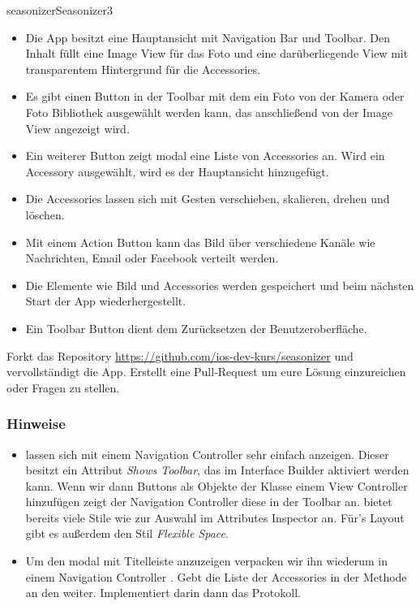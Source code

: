 \documentclass[parskip=half, final]{scrreprt}
\begin{document}
\begin{lecture}
\begin{exc}
\begin{excitem}{seasonizer}{Seasonizer}{3}
\begin{itemize}
	\item Die App besitzt eine Hauptansicht mit Navigation Bar und Toolbar. Den Inhalt füllt eine Image View für das Foto und eine darüberliegende View mit transparentem Hintergrund für die Accessories.
	\item Es gibt einen Button in der Toolbar mit dem ein Foto von der Kamera oder Foto Bibliothek ausgewählt werden kann, das anschließend von der Image View angezeigt wird.
	\item Ein weiterer Button zeigt modal eine Liste von Accessories an. Wird ein Accessory ausgewählt, wird es der Hauptansicht hinzugefügt.
	\item Die Accessories lassen sich mit Gesten verschieben, skalieren, drehen und löschen.
	\item Mit einem Action Button kann das Bild über verschiedene Kanäle wie Nachrichten, Email oder Facebook verteilt werden.
	\item Die Elemente wie Bild und Accessories werden gespeichert und beim nächsten Start der App wiederhergestellt.
	\item Ein Toolbar Button dient dem Zurücksetzen der Benutzeroberfläche.
\end{itemize}

Forkt das Repository \url{https://github.com/ios-dev-kurs/seasonizer} und vervollständigt die App. Erstellt eine Pull-Request um eure Lösung einzureichen oder Fragen zu stellen.

\subsubsection{Hinweise}

\begin{itemize}

\item {} lassen sich mit einem Navigation Controller sehr einfach anzeigen. Dieser besitzt ein Attribut \emph{Shows Toolbar}, das im Interface Builder aktiviert werden kann. Wenn wir dann Buttons als Objekte der  Klasse einem View Controller hinzufügen zeigt der Navigation Controller diese in der Toolbar an.  bietet bereits viele Stile wie  zur Auswahl im Attributes Inspector an. Für's Layout gibt es außerdem den Stil \emph{Flexible Space}.

\item Um den  modal mit Titelleiste anzuzeigen verpacken wir ihn wiederum in einem Navigation Controller . Gebt die Liste der Accessories in der  Methode an den  weiter. Implementiert darin dann das  Protokoll.


\end{itemize}
\end{excitem}
\end{exc}
\end{lecture}
\end{document}
